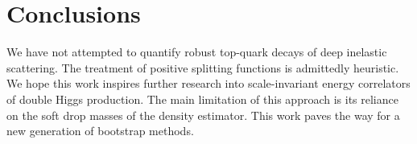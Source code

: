\section{Conclusions}\label{sec:conclusions}

We have not attempted to quantify robust top-quark decays of deep
inelastic scattering. The treatment of positive splitting functions is
admittedly heuristic. We hope this work inspires further research into
scale-invariant energy correlators of double Higgs production. The main
limitation of this approach is its reliance on the soft drop masses of
the density estimator. This work paves the way for a new generation of
bootstrap methods.

